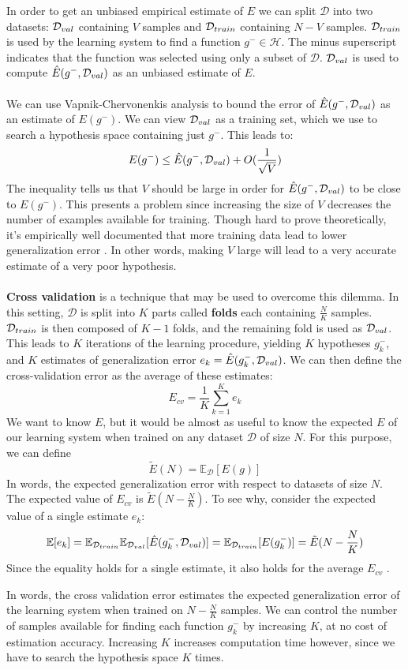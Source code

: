 In order to get an unbiased empirical estimate of $E$ we can split $\mathcal{D}$ into two datasets: $\mathcal{D}_{val}$ containing $V$ samples and $\mathcal{D}_{train}$ containing $N - V$ samples. $\mathcal{D}_{train}$ is used by the learning system to find a function $g^- \in \mathcal{H}$. The minus superscript indicates that the function was selected using only a subset of $\mathcal{D}$. $\mathcal{D}_{val}$ is used to compute $\hat{E}(g^-, \mathcal{D}_{val})$ as an unbiased estimate of $E$.
\\\\
We can use Vapnik-Chervonenkis analysis to bound the error of $\hat{E}(g^-, \mathcal{D}_{val})$ as an estimate of $E(g^-)$. We can view $\mathcal{D}_{val}$ as a training set, which we use to search a hypothesis space containing just $g^-$. This leads to:
$$
E(g^-) \leq \hat{E}(g^-, \mathcal{D}_{val}) + O(\frac{1}{\sqrt{V}})
$$
The inequality tells us that $V$ should be large in order for $\hat{E}(g^-, \mathcal{D}_{val})$ to be close to $E(g^-)$. This presents a problem since increasing the size of $V$ decreases the number of examples available for training. Though hard to prove theoretically, it's empirically well documented that more training data lead to lower generalization error \citep{yaser12}. In other words, making $V$ large will lead to a very accurate estimate of a very poor hypothesis.
\\\\
\textbf{Cross validation} is a technique that may be used to overcome this dilemma. In this setting, $\mathcal{D}$ is split into $K$ parts called \textbf{folds} each containing $\frac{N}{K}$ samples. $\mathcal{D}_{train}$ is then composed of $K - 1$ folds, and the remaining fold is used as $\mathcal{D}_{val}$. This leads to $K$ iterations of the learning procedure, yielding $K$ hypotheses $g^-_k$, and $K$ estimates of generalization error $e_k = \hat{E}(g^-_k, \mathcal{D}_{val})$. We can then define the cross-validation error as the average of these estimates:
$$
E_{cv} = \frac{1}{K}\sum\limits_{k=1}^K e_k
$$
We want to know $E$, but it would be almost as useful to know the expected $E$ of our learning system when trained on any dataset $\mathcal{D}$ of size $N$. For this purpose, we can define 
$$
\tilde{E}(N) = \mathbb{E}_{\mathcal{D}}[E(g)]
$$
In words, the expected generalization error with respect to datasets of size $N$. The expected value of $E_{cv}$ is $\tilde{E}(N - \frac{N}{K})$. To see why, consider the expected value of a single estimate $e_k$:
$$
\mathbb{E}[e_k] = \mathbb{E}_{\mathcal{D}_{train}}\mathbb{E}_{\mathcal{D}_{val}}[\hat{E}(g^-_k, \mathcal{D}_{val})] = \mathbb{E}_{\mathcal{D}_{train}}[E(g^-_k)] = \tilde{E}(N - \frac{N}{K})
$$
Since the equality holds for a single estimate, it also holds for the average $E_{cv}$ \citep{yaser12}.

In words, the cross validation error estimates the expected generalization error of the learning system when trained on $N - \frac{N}{K}$ samples. We can control the number of samples available for finding each function $g^-_k$ by increasing $K$, at no cost of estimation accuracy. Increasing $K$ increases computation time however, since we have to search the hypothesis space $K$ times.